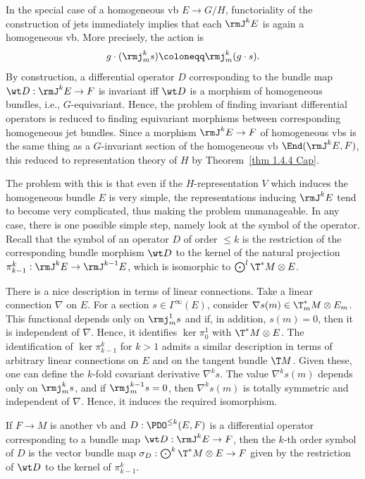 In the special case of a homogeneous \gls{vb} $E\to G\slash H$, functoriality of the construction of jets immediately implies that each $\rmJ^k E$ is again a homogeneous \gls{vb}. More precisely, the action is 
\[g\cdot (\rmj^k_m s)\coloneqq \rmj^k_m(g\cdot s).\]
By construction, a differential operator $D$ corresponding to the bundle map $\wt D:\rmJ^k E\to F$ is invariant iff $\wt D$ is a morphism of homogeneous bundles, i.e., $G$-equivariant. Hence, the problem of finding invariant differential operators is reduced to finding equivariant morphisms between corresponding homogeneous jet bundles. Since a morphism $\rmJ^k E\to F$ of homogeneous \glspl{vb} is the same thing as a $G$-invariant section of the homogeneous \gls{vb} $\End(\rmJ^k E,F)$, this reduced to representation theory of $H$ by Theorem~\ref{thm 1.4.4 Cap}.

The problem with this is that even if the $H$-representation $V$ which induces the homogeneous bundle $E$ is very simple, the representations inducing $\rmJ^k E$ tend to become very complicated, thus making the problem unmanageable. In any case, there is one possible simple step, namely look at the symbol of the operator. Recall that the symbol of an operator $D$ of order $\leq k$ is the restriction of the corresponding bundle morphism $\wt D$ to the kernel of the natural projection $\pi^k_{k-1}:\rmJ^k E\to \rmJ^{k-1}E$, which is isomorphic to $\bigodot\nolimits^l \T^\ast M\otimes E$.

There is a nice description in terms of linear connections. Take a linear connection $\nabla$ on $E$. For a section $s\in\Gamma^\infty(E)$, consider $\nabla s(m)\in\T^\ast_m M\otimes E_m$. This functional depends only on $\rmj^1_m s$ and if, in addition, $s(m)=0$, then it is independent of $\nabla$. Hence, it identifies $\ker \pi^1_0$ with $\T^\ast M\otimes E$. The identification of $\ker \pi^k_{k-1}$ for $k>1$ admits a similar description in terms of arbitrary linear connections on $E$ and on the tangent bundle $\T M$. Given these, one can define the $k$-fold covariant derivative $\nabla^k s$. The value $\nabla^k s(m)$ depends only on $\rmj^k_m s$, and if $\rmj^{k-1}_m s=0$, then $\nabla^k s(m)$ is totally symmetric and independent of $\nabla$. Hence, it induces the required isomorphism.

If $F\to M$ is another \gls{vb} and $D:\PDO^{\leq k}(E,F)$ is a differential operator corresponding to a bundle map $\wt D:\rmJ^k E\to F$, then the $k$-th order symbol of $D$ is the vector bundle map $\sigma_D:\bigodot\nolimits^k \T^\ast M\otimes E\to F$ given by the restriction of $\wt D$ to the kernel of $\pi^k_{k-1}$.

